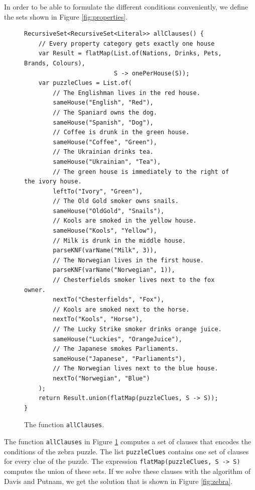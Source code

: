 In order to be able to formulate the different conditions conveniently, we define the sets
shown in Figure \ref{fig:properties}.

\begin{figure}[!ht]
\centering
\begin{verbatim}
RecursiveSet<RecursiveSet<Literal>> allClauses() {
    // Every property category gets exactly one house
    var Result = flatMap(List.of(Nations, Drinks, Pets, Brands, Colours),
                         S -> onePerHouse(S));
    var puzzleClues = List.of(
        // The Englishman lives in the red house.
        sameHouse("English", "Red"),
        // The Spaniard owns the dog.
        sameHouse("Spanish", "Dog"), 
        // Coffee is drunk in the green house.
        sameHouse("Coffee", "Green"),
        // The Ukrainian drinks tea.
        sameHouse("Ukrainian", "Tea"),
        // The green house is immediately to the right of the ivory house.
        leftTo("Ivory", "Green"), 
        // The Old Gold smoker owns snails.
        sameHouse("OldGold", "Snails"), 
        // Kools are smoked in the yellow house.
        sameHouse("Kools", "Yellow"), 
        // Milk is drunk in the middle house.
        parseKNF(varName("Milk", 3)), 
        // The Norwegian lives in the first house.
        parseKNF(varName("Norwegian", 1)), 
        // Chesterfields smoker lives next to the fox owner.
        nextTo("Chesterfields", "Fox"),                                         
        // Kools are smoked next to the horse.
        nextTo("Kools", "Horse"), 
        // The Lucky Strike smoker drinks orange juice.
        sameHouse("Luckies", "OrangeJuice"),                                              
        // The Japanese smokes Parliaments.
        sameHouse("Japanese", "Parliaments"), 
        // The Norwegian lives next to the blue house.
        nextTo("Norwegian", "Blue") 
    );
    return Result.union(flatMap(puzzleClues, S -> S));
}
\end{verbatim}
\vspace*{-0.3cm}
\caption{The function \texttt{allClauses}.}
\label{fig:zebra-allClauses}
\end{figure}
The function \texttt{allClauses} in Figure \ref{fig:zebra-allClauses} computes a set of clauses that encodes the
conditions of the zebra puzzle.  The list \texttt{puzzleClues} contains one set of clauses for every clue of
the puzzle.  The expression \texttt{flatMap(puzzleClues, S -> S)} computes the union of these sets.  If we solve these clauses with the algorithm of
Davis and Putnam, we get the solution that is shown in Figure \ref{fig:zebra}.

